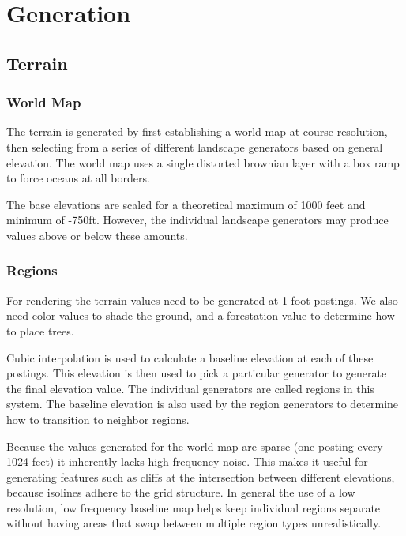 
\chapter{Generation}

\section {Terrain}

\subsection{World Map}

The terrain is generated by first establishing a world map at course resolution, then selecting from a series of different landscape generators based on general elevation.
The world map uses a single distorted brownian layer with a box ramp to force oceans at all borders.

The base elevations are scaled for a theoretical maximum of 1000 feet and minimum of -750ft.
However, the individual landscape generators may produce values above or below these amounts.

\subsection{Regions}

For rendering the terrain values need to be generated at 1 foot postings.
We also need color values to shade the ground, and a forestation value to determine how to place trees.

Cubic interpolation is used to calculate a baseline elevation at each of these postings.
This elevation is then used to pick a particular generator to generate the final elevation value.
The individual generators are called regions in this system.
The baseline elevation is also used by the region generators to determine how to transition to neighbor regions.

Because the values generated for the world map are sparse (one posting every 1024 feet) it inherently lacks high frequency noise.
This makes it useful for generating features such as cliffs at the intersection between different elevations, because isolines adhere to the grid structure.
In general the use of a low resolution, low frequency baseline map helps keep individual regions separate without having areas that swap between multiple region types unrealistically.


